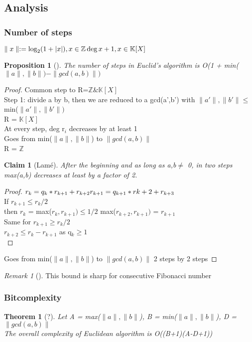 \documentclass{article}
\newtheorem{proposition}{Proposition}
\newtheorem{claim}{Claim}
\newtheorem{theorem}{Theorem}
\theoremstyle{definition}
\theoremstyle{remark}
\newtheorem*{remark}{Remark}
\newcommand{\Thm}[3]{\begin{theorem}[#1]\label{#2}#3\end{theorem}}
\newcommand{\Prop}[3]{\begin{proposition}[#1]\label{#2}#3\end{proposition}}
\newcommand{\Rem}[3]{\begin{remark}[#1]\label{#2}#3\end{remark}}
\newcommand{\Proof}[1]{\begin{proof}#1\end{proof}}
\newcommand{\Z}{\mathbb{Z}}
\newcommand{\K}{\mathbb{K}}
\begin{document}
\subsection{Analysis}
\subsubsection{Number of steps}
$\parallel x \parallel := \log_2(1+|x|),x\in\Z\\
 \deg x + 1, x\in\K[X]$

\Prop{}{}{The number of steps in Euclid's algorithm is O(1 + min($\parallel a \parallel,\parallel b \parallel) - \parallel gcd(a,b)\parallel)$}
\Proof{Common step to R=$\Z \& \K[X]$\\
	Step 1: divide a by b, then we are reduced to a gcd(a',b') with $\parallel a' \parallel,\parallel b' \parallel \leq$ min($\parallel a' \parallel,\parallel b' \parallel)$\\
	R = $\K[X]$\\
	At every step, deg r$_i$ decreases by at least 1\\
	Goes from min($\parallel a \parallel,\parallel b \parallel$) to $\parallel gcd(a,b)\parallel$\\
	R = $\Z$\\
	\begin{claim}[Lamé]
		After the beginning and as long as a,b$\neq$ 0, in two steps max(a,b) decreases at least by a factor of 2.
	\end{claim}
	\Proof{$r_k = q_k*r_{k+1}+r_{k+2}\\
		r_{k+1} = q_{k+1}*r{k+2}+r_{k+3}$\\
		If $r_{k+1} \leq r_k/2$\\
		then $r_k$ = max($r_k,r_{k+1}) \leq 1/2$ max($r_{k+2},r_{k+1})$ = $r_{k+1}$\\
		Same for $r_{k+1} \geq r_k/2$\\
		$r_{k+2} \leq r_k - r_{k+1}$ as q$_k \geq 1$\\}
	Goes from min($\parallel a \parallel,\parallel b \parallel$) to $\parallel gcd(a,b)\parallel$ 2 steps by 2 steps
}

\Rem{}{}{This bound is sharp for consecutive Fibonacci number}

\subsubsection{Bitcomplexity}
\Thm{?}{}{Let A = max($\parallel a \parallel,\parallel b \parallel$), B = min($\parallel a \parallel,\parallel b \parallel$), D = $\parallel gcd(a,b)\parallel$\\
	The overall complexity of Euclidean algorithm is O((B+1)(A-D+1))}
\end{document}
